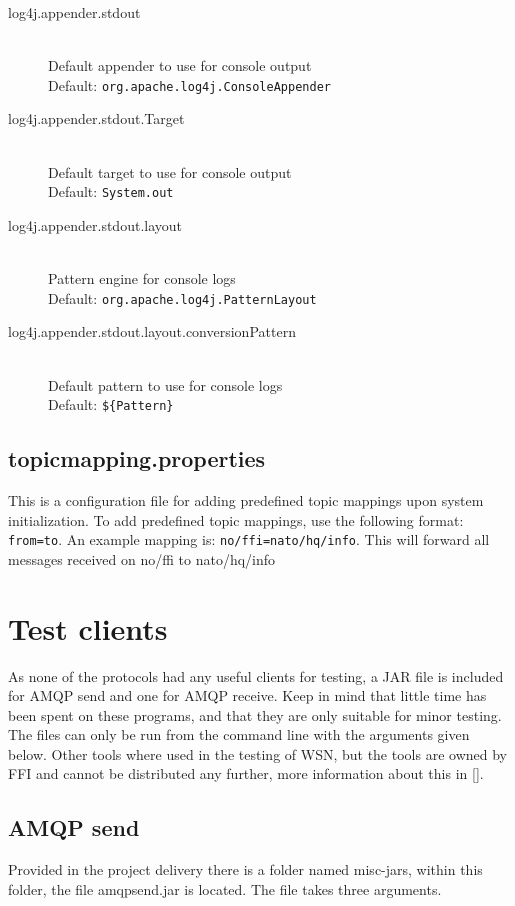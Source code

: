 \begin{description}
 \item[log4j.appender.stdout] \hfill \\
  Default appender to use for console output \hfill \\ Default: \verb!org.apache.log4j.ConsoleAppender!
   \item[log4j.appender.stdout.Target] \hfill \\
  Default target to use for console output \hfill \\ Default: \verb!System.out!
    \item[log4j.appender.stdout.layout] \hfill \\
  Pattern engine for console logs \hfill \\ Default: \verb!org.apache.log4j.PatternLayout!
   \item[log4j.appender.stdout.layout.conversionPattern] \hfill \\
  Default pattern to use for console logs \hfill \\ Default: \verb!${Pattern}!
  
 \end{description}
 
 \subsection{topicmapping.properties}
 \label{subsec:topicmapping.properties}
 
This is a configuration file for adding predefined topic mappings upon system initialization. To add predefined topic mappings, use the following format: \verb!from=to!. An example mapping is: \verb!no/ffi=nato/hq/info!.
This will forward all messages received on no/ffi to nato/hq/info
 
\section{Test clients}
\label{sec:test_clients}
As none of the protocols had any useful clients for testing, a JAR file is included for AMQP send and one for AMQP receive. Keep in mind that little time has been spent on these programs, and that they are only suitable for minor testing. The files can only be run from the command line with the arguments given below. Other tools where used in the testing of WSN, but the tools are owned by FFI and cannot be distributed any further, more information about this in \ref{}.

\subsection{AMQP send}
\label{subsec:test_clients-amqp_send}
Provided in the project delivery there is a folder named misc-jars, within this folder, the file amqpsend.jar is located. The file takes three arguments.

